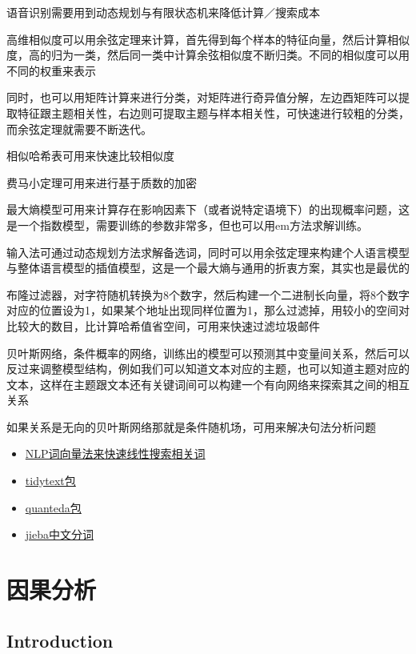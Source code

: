 \documentclass[]{book}
\providecommand{\tightlist}{%
  \setlength{\itemsep}{0pt}\setlength{\parskip}{0pt}}
\begin{document}
语音识别需要用到动态规划与有限状态机来降低计算／搜索成本

高维相似度可以用余弦定理来计算，首先得到每个样本的特征向量，然后计算相似度，高的归为一类，然后同一类中计算余弦相似度不断归类。不同的相似度可以用不同的权重来表示

同时，也可以用矩阵计算来进行分类，对矩阵进行奇异值分解，左边酉矩阵可以提取特征跟主题相关性，右边则可提取主题与样本相关性，可快速进行较粗的分类，而余弦定理就需要不断迭代。

相似哈希表可用来快速比较相似度

费马小定理可用来进行基于质数的加密

最大熵模型可用来计算存在影响因素下（或者说特定语境下）的出现概率问题，这是一个指数模型，需要训练的参数非常多，但也可以用em方法求解训练。

输入法可通过动态规划方法求解备选词，同时可以用余弦定理来构建个人语言模型与整体语言模型的插值模型，这是一个最大熵与通用的折衷方案，其实也是最优的

布隆过滤器，对字符随机转换为8个数字，然后构建一个二进制长向量，将8个数字对应的位置设为1，如果某个地址出现同样位置为1，那么过滤掉，用较小的空间对比较大的数目，比计算哈希值省空间，可用来快速过滤垃圾邮件

贝叶斯网络，条件概率的网络，训练出的模型可以预测其中变量间关系，然后可以反过来调整模型结构，例如我们可以知道文本对应的主题，也可以知道主题对应的文本，这样在主题跟文本还有关键词间可以构建一个有向网络来探索其之间的相互关系

如果关系是无向的贝叶斯网络那就是条件随机场，可用来解决句法分析问题

\begin{itemize}
\tightlist
\item
  \href{https://juliasilge.com/blog/tidy-word-vectors/}{NLP词向量法来快速线性搜索相关词}
\item
  \href{https://cran.r-project.org/web/packages/tidytext/vignettes/tidytext.html}{tidytext包}
\item
  \href{http://docs.quanteda.io/index.html}{quanteda包}
\item
  \href{https://github.com/qinwf/jiebaR}{jieba中文分词}
\end{itemize}

\chapter{因果分析}

\hypertarget{introduction-1}{%
\section{Introduction}\label{introduction-1}}
\end{document}
